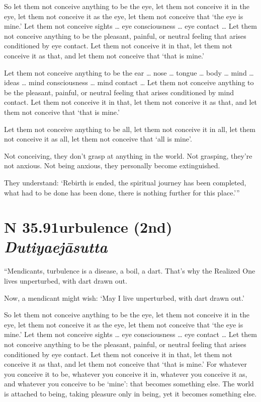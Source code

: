 \documentclass[12pt,openany]{book}%
\newcommand*{\suttatitleacronym}[1]{\smaller[2]{#1}\vspace*{.3em}}
\newcommand*{\suttatitletranslation}[1]{\linebreak{#1}}
\newcommand*{\suttatitleroot}[1]{\linebreak\smaller[2]\itshape{#1}}
\newcommand*{\tocacronym}[1]{\hspace*{-3.3em}{#1}\quad}
\newcommand*{\toctranslation}[1]{#1}
\newcommand*{\tocroot}[1]{(\textit{#1})}
\begin{document}
So let them not conceive anything to be the eye, let them not conceive it in the eye, let them not conceive it as the eye, let them not conceive that ‘the eye is mine.’ Let them not conceive sights … eye consciousness … eye contact … Let them not conceive anything to be the pleasant, painful, or neutral feeling that arises conditioned by eye contact. Let them not conceive it in that, let them not conceive it as that, and let them not conceive that ‘that is mine.’ 

Let them not conceive anything to be the ear … nose … tongue … body … mind … ideas … mind consciousness … mind contact … Let them not conceive anything to be the pleasant, painful, or neutral feeling that arises conditioned by mind contact. Let them not conceive it in that, let them not conceive it as that, and let them not conceive that ‘that is mine.’ 

Let them not conceive anything to be all, let them not conceive it in all, let them not conceive it as all, let them not conceive that ‘all is mine’. 

Not conceiving, they don’t grasp at anything in the world. Not grasping, they’re not anxious. Not being anxious, they personally become extinguished. 

They understand: ‘Rebirth is ended, the spiritual journey has been completed, what had to be done has been done, there is nothing further for this place.’” 

%
\section*{{\suttatitleacronym SN 35.91}{\suttatitletranslation Turbulence (2nd) }{\suttatitleroot Dutiyaejāsutta}}
\addcontentsline{toc}{section}{\tocacronym{SN 35.91} \toctranslation{Turbulence (2nd) } \tocroot{Dutiyaejāsutta}}

“Mendicants, turbulence is a disease, a boil, a dart. That’s why the Realized One lives unperturbed, with dart drawn out. 

Now, a mendicant might wish: ‘May I live unperturbed, with dart drawn out.’ 

So let them not conceive anything to be the eye, let them not conceive it in the eye, let them not conceive it as the eye, let them not conceive that ‘the eye is mine.’ Let them not conceive sights … eye consciousness … eye contact … Let them not conceive anything to be the pleasant, painful, or neutral feeling that arises conditioned by eye contact. Let them not conceive it in that, let them not conceive it as that, and let them not conceive that ‘that is mine.’ For whatever you conceive it to be, whatever you conceive it in, whatever you conceive it as, and whatever you conceive to be ‘mine’: that becomes something else. The world is attached to being, taking pleasure only in being, yet it becomes something else. 
\end{document}
